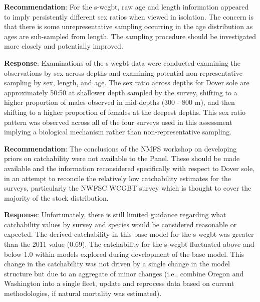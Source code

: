 \documentclass[11pt,
  english,
  a4paper,
]{article}
\begin{document}
\leavevmode\tagmcend\tagstructend\par


\textbf{Recommendation}: For the \gls{s-wcgbt}, raw age and length information appeared to imply persistently different sex ratios when viewed in isolation. The concern is that there is some unrepresentative sampling occurring in the age distribution as ages are sub-sampled from length. The sampling procedure should be investigated more closely and potentially improved.

\leavevmode\tagmcend\tagstructend\par


\textbf{Response}: Examinations of the \gls{s-wcgbt} data were conducted examining the observations by sex across depths and examining potential non-representative sampling by sex, length, and age. The sex ratio across depths for Dover sole are approximately 50:50 at shallower depth sampled by the survey, shifting to a higher proportion of males observed in mid-depths (300 - 800 m), and then shifting to a higher proportion of females at the deepest depths. This sex ratio pattern was observed across all of the four surveys used in this assessment implying a biological mechanism rather than non-representative sampling.

\leavevmode\tagmcend\tagstructend\par


\textbf{Recommendation}: The conclusions of the NMFS workshop on developing priors on catchability were not available to the Panel. These should be made available and the information reconsidered specifically with respect to Dover sole, in an attempt to reconcile the relatively low catchability estimates for the surveys, particularly the NWFSC WCGBT survey which is thought to cover the majority of the stock distribution.

\leavevmode\tagmcend\tagstructend\par


\textbf{Response}: Unfortunately, there is still limited guidance regarding what catchability values by survey and species would be considered reasonable or expected. The derived catchability in this base model for the \gls{s-wcgbt} was greater than the 2011 value (0.69). The catchability for the \gls{s-wcgbt} fluctuated above and below 1.0 within models explored during development of the base model. This change in the catchability was not driven by a single change in the model structure but due to an aggregate of minor changes (i.e., combine Oregon and Washington into a single fleet, update and reprocess data based on current methodologies, if natural mortality was estimated).
\end{document}
